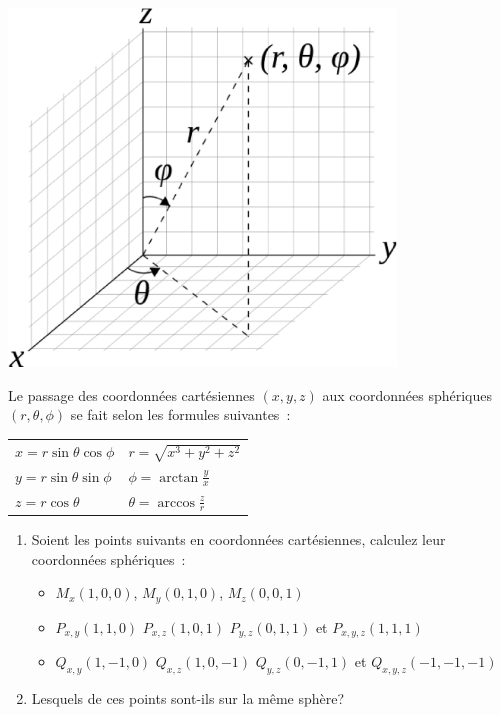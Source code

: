 
\begin{center}
\includegraphics[height=9.5cm]{figure/spheriques.eps}\\
\end{center}

Le passage des coordonn\'ees cart\'esiennes $(x,y,z)$ aux coordonn\'ees sph\'eriques $(r,\theta,\phi)$
se fait selon les formules suivantes~:

\vspace{0.3cm}

\begin{center}
\begin{tabular}{ll}
$x=r\sin\theta\cos\phi$  &  $r=\sqrt{x^3+y^2+z^2}$          \\
$y=r\sin\theta\sin\phi$  &  $\phi = \arctan\frac{y}{x}$     \\
$z=r\cos\theta$          &  $\theta = \arccos\frac{z}{r}$   \\
\end{tabular}
\end{center}

\vspace{0.3cm}

\begin{enumerate}
\item Soient les points suivants en coordonn\'ees cart\'esiennes, calculez leur coordonn\'ees sph\'eriques~:

\begin{itemize}
\item $M_x(1,0,0)$, $M_y(0,1,0)$, $M_z(0,0,1)$
\item $P_{x,y}(1,1,0)$ $P_{x,z}(1,0,1)$ $P_{y,z}(0,1,1)$ et $P_{x,y,z}(1,1,1)$
\item $Q_{x,y}(1,-1,0)$ $Q_{x,z}(1,0,-1)$ $Q_{y,z}(0,-1,1)$ et $Q_{x,y,z}(-1,-1,-1)$
\end{itemize}

\item Lesquels de ces points sont-ils sur la m\^eme sph\`ere?
\end{enumerate}


